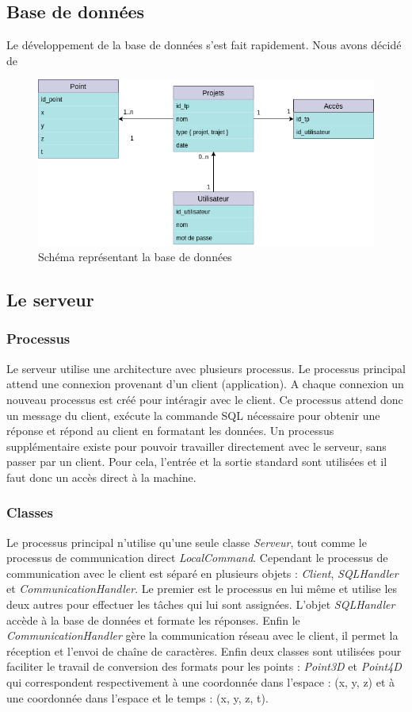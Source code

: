 \subsection{Base de données}
Le développement de la base de données s'est fait rapidement. Nous avons décidé de 
\begin{figure}[ht]
    \label{Schéma de la base de données}
    \centering
    \includegraphics[scale=0.6]{images/bdd.png}
    \caption{Schéma représentant la base de données}
\end{figure}

\subsection{Le serveur}
\subsubsection{Processus}
Le serveur utilise une architecture avec plusieurs processus. Le processus principal attend une connexion provenant d'un client (application).
A chaque connexion un nouveau processus est créé pour intéragir avec le client. Ce processus attend donc un message du client, exécute la commande
SQL nécessaire pour obtenir une réponse et répond au client en formatant les données. Un processus supplémentaire existe pour pouvoir
travailler directement avec le serveur, sans passer par un client. Pour cela, l'entrée et la sortie standard sont utilisées et il faut donc un accès direct à la machine.
\subsubsection{Classes}
Le processus principal n'utilise qu'une seule classe \emph{Serveur}, tout comme le processus de communication direct \emph{LocalCommand}.
Cependant le processus de communication avec le client est séparé en plusieurs objets : \emph{Client}, \emph{SQLHandler} et \emph{CommunicationHandler}. 
Le premier est le processus en lui même et utilise les deux autres pour effectuer les tâches qui lui sont assignées. L'objet \emph{SQLHandler} accède à la base de données et formate les réponses.
Enfin le \emph{CommunicationHandler} gère la communication réseau avec le client, il permet la réception et l'envoi de chaîne de caractères.
Enfin deux classes sont utilisées pour faciliter le travail de conversion des formats pour les points : \emph{Point3D} et \emph{Point4D} qui correspondent respectivement à une coordonnée dans l'espace : (x, y, z)
et à une coordonnée dans l'espace et le temps : (x, y, z, t).
